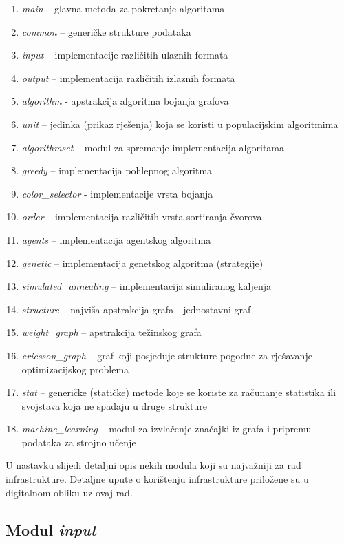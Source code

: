 \documentclass[times, utf8, diplomski, numeric]{fer}
\begin{document}
\begin{enumerate}
	\item \emph{main} -- glavna metoda za pokretanje algoritama
	\item \emph{common} -- generičke strukture podataka
	\item \emph{input} -- implementacije različitih ulaznih formata
	\item \emph{output} -- implementacija različitih izlaznih formata
	\item \emph{algorithm} - apstrakcija algoritma bojanja grafova
	\item \emph{unit} -- jedinka (prikaz rješenja) koja se koristi u populacijskim algoritmima
	\item \emph{algorithmset} -- modul za spremanje implementacija algoritama
	\item \emph{greedy} -- implementacija pohlepnog algoritma
	\item \emph{color\_selector} - implementacije vrsta bojanja
	\item \emph{order} -- implementacija različitih vrsta sortiranja čvorova
	\item \emph{agents} -- implementacija agentskog algoritma
	\item \emph{genetic} -- implementacija genetskog algoritma (strategije)
	\item \emph{simulated\_annealing} -- implementacija simuliranog kaljenja
	\item \emph{structure} -- najviša apstrakcija grafa - jednostavni graf
	\item \emph{weight\_graph} -- apstrakcija težinskog grafa 
	\item \emph{ericsson\_graph} -- graf koji posjeduje strukture pogodne za rješavanje optimizacijskog problema
	\item \emph{stat} -- generičke (statičke) metode koje se koriste za računanje statistika ili svojstava koja ne spadaju u druge strukture
	\item \emph{machine\_learning} -- modul za izvlačenje značajki iz grafa i pripremu podataka za strojno učenje
\end{enumerate}

U nastavku slijedi detaljni opis nekih modula koji su najvažniji za rad infrastrukture. Detaljne upute o korištenju infrastrukture priložene su u digitalnom obliku uz ovaj rad.

\subsection{Modul \emph{input}}
\end{document}
